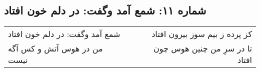 \begin{center}
\section*{شماره ۱۱: شمع آمد وگفت: در دلم خون افتاد}
\label{sec:011}
\begin{longtable}{l p{0.5cm} r}
شمع آمد وگفت: در دلم خون افتاد
&&
کز پرده ز بیم سوز بیرون افتاد
\\
من در هوس آتش و کس آگه نیست
&&
تا در سرِ من چنین هوس چون افتاد
\\
\end{longtable}
\end{center}
